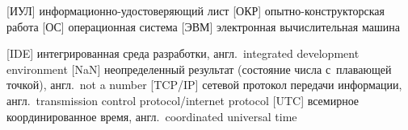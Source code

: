 \renewcommand*{\aclabelfont}[1]{\acsfont{#1}} %

\newcommand{\abbstart}{} %

\newcommand{\abbdash}{\acroextra{\hspace{-0.5mm}--} } %

\newcommand{\abbendl}{} %

\begin{acronym}[\hspace{-0.2cm}] %
[\abbstart ИУЛ]{\abbdash информационно-удостоверяющий лист\abbendl}
[\abbstart ОКР]{\abbdash опытно-конструкторская работа\abbendl}
[\abbstart ОС]{\abbdash операционная система\abbendl}
[\abbstart ЭВМ]{\abbdash электронная вычислительная машина\abbendl}

\vspace{5mm}

[\abbstart IDE]{\abbdash интегрированная среда разработки, англ.~integrated development environment\abbendl}
[\abbstart NaN]{\abbdash неопределенный результат (состояние числа с~плавающей точкой), англ.~not a number\abbendl}
[\abbstart TCP/IP]{\abbdash сетевой протокол передачи информации, англ.~transmission control protocol/internet protocol\abbendl}
[\abbstart UTC]{\abbdash всемирное координированное время, англ.~coordinated universal time\abbendl}
\end{acronym}
